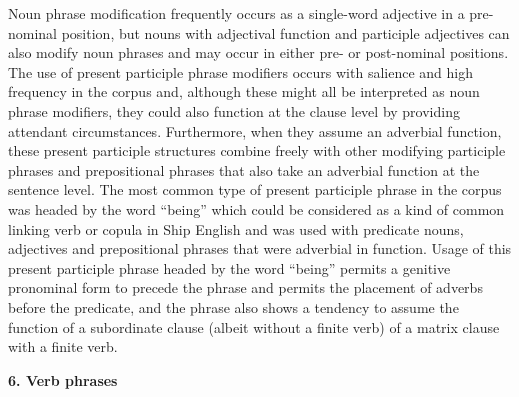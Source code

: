 \begin{styleStandard}
Noun phrase modification frequently occurs as a single-word adjective in a pre-nominal position, but nouns with adjectival function and participle adjectives can also modify noun phrases and may occur in either pre- or post-nominal positions. The use of present participle phrase modifiers occurs with salience and high frequency in the corpus and, although these might all be interpreted as noun phrase modifiers, they could also function at the clause level by providing attendant circumstances. Furthermore, when they assume an adverbial function, these present participle structures combine freely with other modifying participle phrases and prepositional phrases that also take an adverbial function at the sentence level. The most common type of present participle phrase in the corpus was headed by the word “being” which could be considered as a kind of common linking verb or copula in Ship English and was used with predicate nouns, adjectives and prepositional phrases that were adverbial in function. Usage of this present participle phrase headed by the word “being” permits a genitive pronominal form to precede the phrase and permits the placement of adverbs before the predicate, and the phrase also shows a tendency to assume the function of a subordinate clause (albeit without a finite verb) of a matrix clause with a finite verb. 
\end{styleStandard}


\clearpage\begin{styleStandard}
\textbf{6. Verb phrases}
\end{styleStandard}


